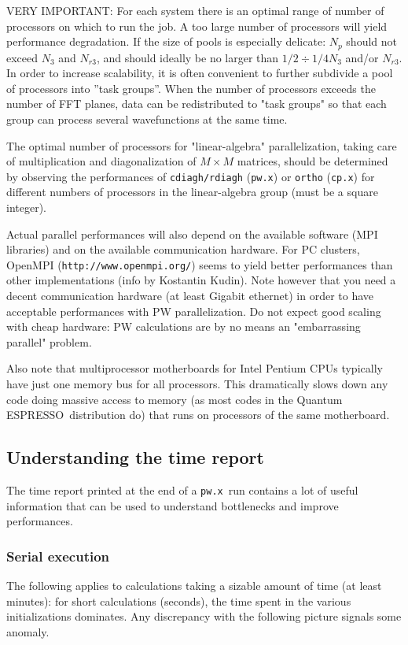 \documentclass[12pt,a4paper]{article}
\def\qe{{\sc Quantum ESPRESSO}}
\def\pwx{\texttt{pw.x}}
\def\cpx{\texttt{cp.x}}
\begin{document}
VERY IMPORTANT: For each system there is an optimal range of number of processors on which to 
run the job.  A too large number of processors will yield performance 
degradation. If the size of pools is especially delicate: $N_p$ should not 
exceed $N_3$ and $N_{r3}$, and should ideally be no larger than
$1/2\div1/4 N_3$ and/or $N_{r3}$. In order to increase scalability,
it is often convenient to 
further subdivide a pool of processors into ''task groups''.
When the number of processors exceeds the number of FFT planes, 
data can be redistributed to "task groups" so that each group 
can process several wavefunctions at the same time.

The optimal number of processors for "linear-algebra"
parallelization, taking care of multiplication and diagonalization 
of $M\times M$ matrices, should be determined by observing the
performances of \texttt{cdiagh/rdiagh} (\pwx) or \texttt{ortho} (\cpx)
for different numbers of processors in the linear-algebra group
(must be a square integer).

Actual parallel performances will also depend on the available software 
(MPI libraries) and on the available communication hardware. For
PC clusters, OpenMPI (\texttt{http://www.openmpi.org/}) seems to yield better 
performances than other implementations (info by Kostantin Kudin). 
Note however that you need a decent communication hardware (at least 
Gigabit ethernet) in order to have acceptable performances with 
PW parallelization. Do not expect good scaling with cheap hardware: 
PW calculations are by no means an "embarrassing parallel" problem.
   
Also note that multiprocessor motherboards for Intel Pentium CPUs typically 
have just one memory bus for all processors. This dramatically
slows down any code doing massive access to memory (as most codes 
in the \qe\ distribution do) that runs on processors of the same
motherboard.

\subsection{Understanding the time report}

The time report printed at the end of a \pwx\ run contains a lot of useful 
information that can be used to understand bottlenecks and improve 
performances.

\subsubsection{Serial execution}
The following applies to calculations taking a sizable amount of time
(at least minutes): for short calculations (seconds), the time spent in 
the various initializations dominates. Any discrepancy with the following
picture signals some anomaly.
\end{document}
